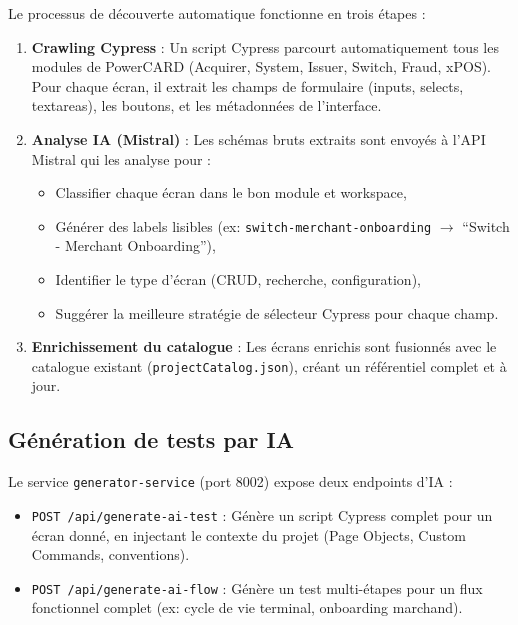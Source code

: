 Le processus de découverte automatique fonctionne en trois étapes :

\begin{enumerate}
\item \textbf{Crawling Cypress} : Un script Cypress parcourt automatiquement tous les modules de PowerCARD (Acquirer, System, Issuer, Switch, Fraud, xPOS). Pour chaque écran, il extrait les champs de formulaire (inputs, selects, textareas), les boutons, et les métadonnées de l'interface.

\item \textbf{Analyse IA (Mistral)} : Les schémas bruts extraits sont envoyés à l'API Mistral qui les analyse pour :
\begin{itemize}[leftmargin=*]
\item Classifier chaque écran dans le bon module et workspace,
\item Générer des labels lisibles (ex: \texttt{switch-merchant-onboarding} $\rightarrow$ ``Switch - Merchant Onboarding''),
\item Identifier le type d'écran (CRUD, recherche, configuration),
\item Suggérer la meilleure stratégie de sélecteur Cypress pour chaque champ.
\end{itemize}

\item \textbf{Enrichissement du catalogue} : Les écrans enrichis sont fusionnés avec le catalogue existant (\texttt{projectCatalog.json}), créant un référentiel complet et à jour.
\end{enumerate}

\subsection{Génération de tests par IA}

Le service \texttt{generator-service} (port 8002) expose deux endpoints d'IA :

\begin{itemize}[leftmargin=*]
\item \texttt{POST /api/generate-ai-test} : Génère un script Cypress complet pour un écran donné, en injectant le contexte du projet (Page Objects, Custom Commands, conventions).
\item \texttt{POST /api/generate-ai-flow} : Génère un test multi-étapes pour un flux fonctionnel complet (ex: cycle de vie terminal, onboarding marchand).
\end{itemize}

